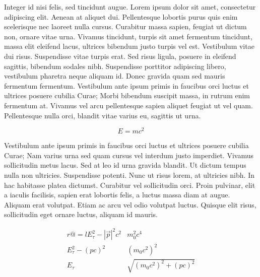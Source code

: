 Integer id nisi felis, sed tincidunt augue.
Lorem ipsum dolor sit amet, consectetur adipiscing elit.
Aenean at aliquet dui.
Pellentesque lobortis purus quis enim scelerisque nec laoreet nulla cursus.
Curabitur massa sapien, feugiat ut dictum non, ornare vitae urna.
Vivamus tincidunt, turpis sit amet fermentum tincidunt, massa elit eleifend lacus, ultrices bibendum justo turpis vel est.
Vestibulum vitae dui risus.
Suspendisse vitae turpis erat.
Sed risus ligula, posuere in eleifend sagittis, bibendum sodales nibh.
Suspendisse porttitor adipiscing libero, vestibulum pharetra neque aliquam id.
Donec gravida quam sed mauris fermentum fermentum.
Vestibulum ante ipsum primis in faucibus orci luctus et ultrices posuere cubilia Curae; Morbi bibendum suscipit massa, in rutrum enim fermentum at.
Vivamus vel arcu pellentesque sapien aliquet feugiat ut vel quam.
Pellentesque nulla orci, blandit vitae varius eu, sagittis ut urna.

\begin{equation}
  E = mc^2
\end{equation}

Vestibulum ante ipsum primis in faucibus orci luctus et ultrices posuere cubilia Curae; Nam varius urna sed quam cursus vel interdum justo imperdiet.
Vivamus sollicitudin metus lacus.
Sed at leo id urna gravida blandit.
Ut dictum tempus nulla non ultricies.
Suspendisse potenti.
Nunc ut risus lorem, at ultricies nibh.
In hac habitasse platea dictumst.
Curabitur vel sollicitudin orci.
Proin pulvinar, elit a iaculis facilisis, sapien erat lobortis felis, a luctus massa diam at augue.
Aliquam erat volutpat.
Etiam ac arcu vel odio volutpat luctus.
Quisque elit risus, sollicitudin eget ornare luctus, aliquam id mauris.

\begin{eqnarray}{r@{=}l}
  E_\tau^2 - |\vec{p}|^2 c^2 & m_0^2 c^4\\
  E_\tau^2 - (pc)^2 & (m_0 c^2)^2\\
  E_\tau & \sqrt{(m_0 c^2)^2 + (pc)^2}
\end{eqnarray}


